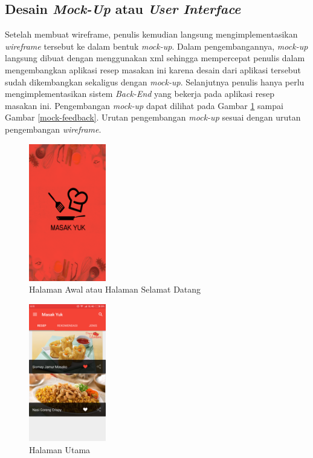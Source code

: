 	\subsection{Desain \textit{Mock-Up} atau \textit{User Interface}}
		Setelah membuat wireframe, penulis kemudian langsung mengimplementasikan \textit{wireframe} tersebut ke dalam bentuk \textit{mock-up}. Dalam pengembangannya, \textit{mock-up} langsung dibuat dengan menggunakan xml sehingga mempercepat penulis dalam mengembangkan aplikasi resep masakan ini karena desain dari aplikasi tersebut sudah dikembangkan sekaligus dengan \textit{mock-up}. Selanjutnya penulis hanya perlu mengimplementasikan sistem \textit{Back-End} yang bekerja pada aplikasi resep masakan ini. Pengembangan \textit{mock-up} dapat dilihat pada Gambar \ref{mock-welcome} sampai Gambar \ref{mock-feedback}. Urutan pengembangan \textit{mock-up} sesuai dengan urutan pengembangan \textit{wireframe}.
		\begin{figure}[H]
			\centering
			\includegraphics[width=0.3\textwidth]{gambar/mock-up/splash}
			\caption{Halaman Awal atau Halaman Selamat Datang}
			\label{mock-welcome}
		\end{figure}
		\begin{figure}[H]
			\centering
			\includegraphics[width=0.3\textwidth]{gambar/mock-up/utama}
			\caption{Halaman Utama}
		\end{figure}
